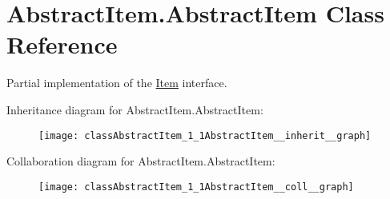 \hypertarget{classAbstractItem_1_1AbstractItem}{}\section{Abstract\+Item.\+Abstract\+Item Class Reference}
\label{classAbstractItem_1_1AbstractItem}


Partial implementation of the \hyperlink{namespaceItem}{Item} interface.  




Inheritance diagram for Abstract\+Item.\+Abstract\+Item\+:\nopagebreak
\begin{figure}[H]
\begin{center}
\leavevmode
\texttt{[image: classAbstractItem\_1\_1AbstractItem\_\_inherit\_\_graph]}
\end{center}
\end{figure}


Collaboration diagram for Abstract\+Item.\+Abstract\+Item\+:\nopagebreak
\begin{figure}[H]
\begin{center}
\leavevmode
\texttt{[image: classAbstractItem\_1\_1AbstractItem\_\_coll\_\_graph]}
\end{center}
\end{figure}
